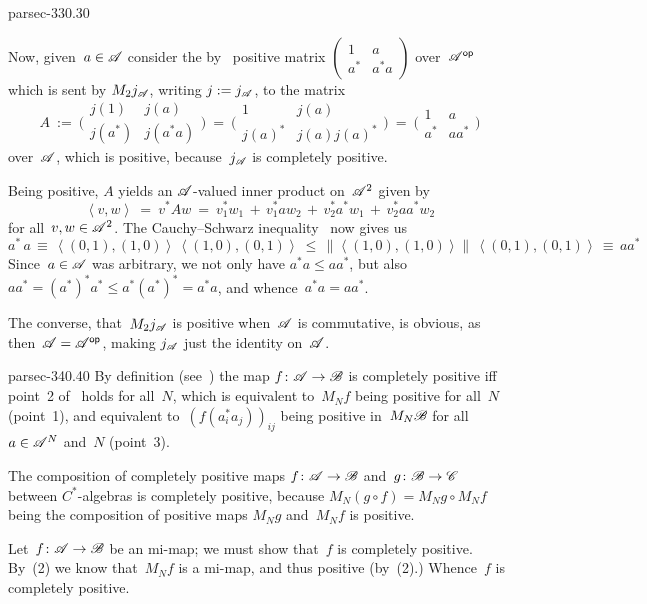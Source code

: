 \documentclass[b5page]{book}
\begin{document}
\begin{solution}{parsec-330.30}
\begin{enumerate}
Now, given~$a\in\mathscr{A}$
consider
the 
by~ positive
matrix $(\begin{smallmatrix}1 & a \\ a^* & a^*a \end{smallmatrix})$
over~${\mathscr{A}}{^{\mathsf{op}}}$
which is sent by $M_2j_{\mathscr{A}}$,
writing $j:=j_{\mathscr{A}}$,
to the matrix  
$$
A\ :=\ 
\bigl(\begin{smallmatrix}j(1) & j(a) \\ j(a^*) & j(a^*a)\end{smallmatrix}\bigr)
\ =\
\bigl(\begin{smallmatrix}1 & j(a) \\ j(a)^* & j(a)j(a)^*\end{smallmatrix}\bigr)
\ =\
\bigl(\begin{smallmatrix}1 & a \\ a^* & aa^*\end{smallmatrix}\bigr)
$$
over~$\mathscr{A}$,
which is positive, because~$j_{\mathscr{A}}$ is completely positive.

Being positive, 
$A$ yields an $\mathscr{A}$-valued inner product
on~$\mathscr{A}^2$ given by
$$
\left<v,w\right>\ = \ v^* A w\ = \ 
v_1^* w_1 \,+\,
v_1^*a w_2 \,+\,
v_2^*a^*w_1 \,+\,
v_2^* aa^* w_2
$$
for all~$v,w\in \mathscr{A}^2$.
The Cauchy--Schwarz inequality~
now gives us 
$$
a^*\, a \,\equiv\, 
\left<(0,1),(1,0)\right>\,
\left<(1,0),(0,1)\right>\ \leq\, 
\|\left<(1,0),(1,0)\right>\|
\,\left<(0,1),(0,1)\right>
\,\equiv\, aa^*
$$
Since~$a\in \mathscr{A}$ was arbitrary,
we not only have $a^*a\leq aa^*$,
but also $aa^* = (a^*)^* a^* \leq a^* (a^*)^*=a^*a$,
and whence~$a^*a=aa^*$.

The converse,
that~$M_2j_{\mathscr{A}}$ is positive when~$\mathscr{A}$
is commutative, is obvious,
as then~$\mathscr{A}={\mathscr{A}}{^{\mathsf{op}}}$,
making $j_{\mathscr{A}}$ just the identity on~$\mathscr{A}$.
\end{enumerate}
\end{solution}
\begin{solution}{parsec-340.40}%
By definition (see~\sref{parsec-100.20})
the map $f\colon \mathscr{A}\to\mathscr{B}$
is completely positive iff point~2 of~ holds
for all~$N$,
which is equivalent to~$M_Nf$ being positive for all~$N$
(point~1),
and equivalent to~$(f(a_i^* a_j))_{ij}$ being positive
in~$M_N\mathscr{B}$
for all~$a\in \mathscr{A}^N$ and~$N$ (point~3).

The composition of completely positive maps
$f\colon \mathscr{A}\to\mathscr{B}$
and~$g\colon \mathscr{B}\to\mathscr{C}$
between $C^*$-algebras
is completely positive,
because $M_N(g\circ f)=M_Ng\circ M_Nf$
being the composition of positive maps $M_Ng$
and~$M_Nf$ is positive.

Let~$f\colon \mathscr{A}\to\mathscr{B}$
be an mi-map;
we must show that~$f$ is completely positive.
By~(2)
we know that~$M_Nf$ is a mi-map,
and thus positive (by~(2).)
Whence~$f$ is completely positive.
\end{solution}
\end{document}
